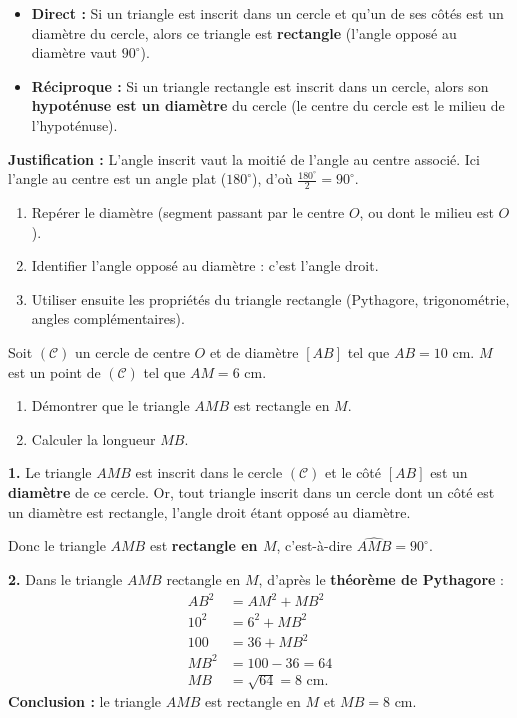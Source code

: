 \documentclass[11pt]{article}
\newcommand{\cle}[1]{{\popxbold\color{popdark}#1}}
\begin{document}
\begin{propriete}
\begin{itemize}
\item \textbf{Direct :} Si un triangle est inscrit dans un cercle et qu'un de ses côtés est un \cle{diamètre} du cercle, alors ce triangle est \textbf{rectangle} (l'angle opposé au diamètre vaut $90^\circ$).
\item \textbf{Réciproque :} Si un triangle rectangle est inscrit dans un cercle, alors son \textbf{hypoténuse est un diamètre} du cercle (le centre du cercle est le milieu de l'hypoténuse).
\end{itemize}
\textbf{Justification :} L'angle inscrit vaut la moitié de l'angle au centre associé. Ici l'angle au centre est un angle plat ($180^\circ$), d'où $\frac{180^\circ}{2} = 90^\circ$.
\end{propriete}

\begin{methode}
\begin{enumerate}
\item Repérer le diamètre (segment passant par le centre $O$, ou dont le milieu est $O$).
\item Identifier l'angle opposé au diamètre : c'est l'angle droit.
\item Utiliser ensuite les propriétés du triangle rectangle (Pythagore, trigonométrie, angles complémentaires).
\end{enumerate}
\end{methode}

\begin{exoresolu}
Soit $(\mathcal{C})$ un cercle de centre $O$ et de diamètre $[AB]$ tel que $AB = 10$ cm. $M$ est un point de $(\mathcal{C})$ tel que $AM = 6$ cm.
\begin{enumerate}
\item Démontrer que le triangle $AMB$ est rectangle en $M$.
\item Calculer la longueur $MB$.
\end{enumerate}
\tcblower
\textbf{1.} Le triangle $AMB$ est inscrit dans le cercle $(\mathcal{C})$ et le côté $[AB]$ est un \textbf{diamètre} de ce cercle. Or, tout triangle inscrit dans un cercle dont un côté est un diamètre est rectangle, l'angle droit étant opposé au diamètre.

Donc le triangle $AMB$ est \textbf{rectangle en $M$}, c'est-à-dire $\widehat{AMB} = 90^\circ$.

\textbf{2.} Dans le triangle $AMB$ rectangle en $M$, d'après le \textbf{théorème de Pythagore} :
\begin{align*}
AB^2 &= AM^2 + MB^2 \\
10^2 &= 6^2 + MB^2 \\
100 &= 36 + MB^2 \\
MB^2 &= 100 - 36 = 64 \\
MB &= \sqrt{64} = 8 \text{ cm}.
\end{align*}
\textbf{Conclusion :} le triangle $AMB$ est rectangle en $M$ et $MB = 8$ cm.
\end{exoresolu}
\end{document}
